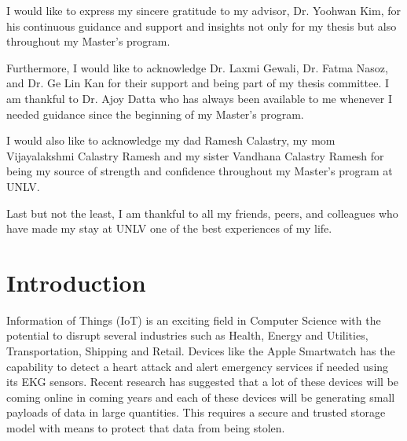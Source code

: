 \documentclass[11pt,openright]{report}
\begin{document}
\begin{thesisacknowledgments}
I would like to express my sincere gratitude to my advisor, Dr. Yoohwan Kim, for his continuous guidance and support and insights not only for my thesis but also throughout my Master's program.

Furthermore, I would like to acknowledge Dr. Laxmi Gewali, Dr. Fatma Nasoz, and Dr. Ge Lin Kan for their support and being part of my thesis committee. I am thankful to Dr. Ajoy Datta who has always been available to me whenever I needed guidance since the beginning of my Master's program.

I would also like to acknowledge my dad Ramesh Calastry, my mom Vijayalakshmi Calastry Ramesh and my sister Vandhana Calastry Ramesh for being my source of strength and confidence throughout my Master's program at UNLV.

Last but not the least, I am thankful to all my friends, peers, and colleagues who have made my stay at UNLV one of the best experiences of my life. 
\end{thesisacknowledgments}

\pagestyle{plain}

\tableofcontents
\clearpage
\listoftables
\clearpage
\listoffigures
\clearpage
\listofalgorithms
\clearpage

\chapter{Introduction}\label{chapter:introduction} 

Information of Things (IoT) is an exciting field in Computer Science with the potential to disrupt several industries such as Health, Energy and Utilities, Transportation, Shipping and Retail. Devices like the Apple Smartwatch has the capability to detect a heart attack and alert emergency services if needed using its EKG sensors. Recent research has suggested that a lot of these devices will be coming online in coming years and each of these devices will be generating small payloads of data in large quantities. This requires a secure and trusted storage model with means to protect that data from being stolen. 
\end{document}
